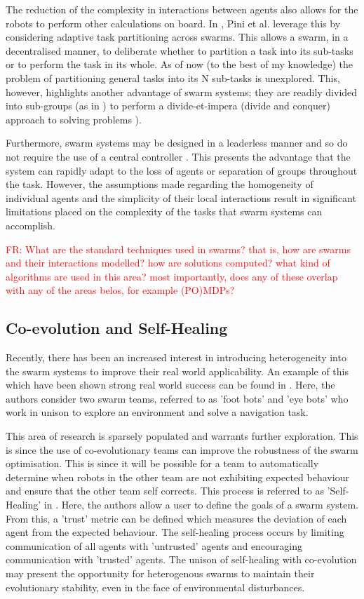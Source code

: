 \documentclass[preprint,11pt]{report}
\newcommand\fr[1]{\textcolor{red}{FR: #1}}
\begin{document}
The reduction of the complexity in interactions between agents also allows for the robots to perform
other calculations on board. In \cite{Pini2011TaskSelection}, Pini et al. leverage this by
considering adaptive task partitioning across swarms. This allows a swarm, in a decentralised
manner, to deliberate whether to partition a task into its sub-tasks or to perform the task in its
whole. As of now (to the best of my knowledge) the problem of partitioning general tasks into its N
sub-tasks is unexplored. This, however, highlights another advantage of swarm systems; they are
readily divided into sub-groups (as in \cite{Zahadat2016DivisionInhibition}) to perform a
divide-et-impera (divide and conquer) approach to solving problems \cite{Pini2011TaskSelection}). 

Furthermore, swarm systems may be designed in a leaderless manner and so do not require the use of a
central controller \cite{Couceiro2015}. This presents the advantage that the system can rapidly
adapt to the loss of agents or separation of groups throughout the task. However, the assumptions
made regarding the homogeneity of individual agents and the simplicity of their local interactions
result in significant limitations placed on the complexity of the tasks that swarm systems can
accomplish.

\fr{What are the standard techniques used in swarms? that is, how are swarms and their interactions modelled? how are solutions computed? what kind of algorithms are used in this area? most importantly, does any of these overlap with any of the areas belos, for example (PO)MDPs?}

\subsection{Co-evolution and Self-Healing}

Recently, there has been an increased interest in introducing
heterogeneity into the swarm systems to improve their real world
applicability. An example of this which have been shown strong real
world success can be found in
\cite{DucatelleSelf-organizedSwarms}. Here, the authors consider two
swarm teams, referred to as 'foot bots' and 'eye bots' who work in
unison to explore an environment and solve a navigation task.

This area of research is sparsely populated and warrants further
exploration. This is since the use of co-evolutionary teams can
improve the robustness of the swarm optimisation. This is since it
will be possible for a team to automatically determine when robots in
the other team are not exhibiting expected behaviour and ensure that
the other team self corrects. This process is referred to as
'Self-Healing' in \cite{LiuTrust-Aware}. Here, the authors allow a
user to define the goals of a swarm system. From this, a 'trust'
metric can be defined which measures the deviation of each agent from
the expected behaviour. The self-healing process occurs by limiting
communication of all agents with 'untrusted' agents and encouraging
communication with 'trusted' agents. The unison of self-healing with
co-evolution may present the opportunity for heterogenous swarms to
maintain their evolutionary stability, even in the face of
environmental disturbances.
\end{document}
